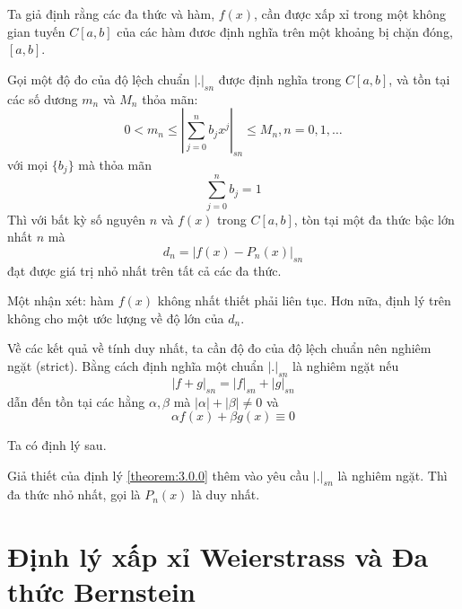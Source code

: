 Ta giả định rằng các đa thức và hàm, $f(x)$, cần được xấp xỉ trong một không gian tuyến $C[a, b]$ của các hàm đươc định nghĩa trên một khoảng bị chặn đóng, $[a, b]$. 

\begin{theorem}
    \label{theorem:3.0.0}
    Gọi một độ đo của độ lệch chuẩn $\left | . \right |_{sn}$ được định nghĩa trong $C[a, b]$, và tồn tại các số dương $m_n$ và $M_n$ thỏa mãn:
    \begin{equation}
        0 < m_n \leq \left | \sum_{j=0}^nb_jx^j \right |_{sn} \leq M_n, n = 0, 1, \dots
    \end{equation}
    với mọi $\{b_j\}$ mà thỏa mãn
    \begin{equation}
        \sum_{j=0}^nb_j = 1
    \end{equation}
    Thì với bất kỳ số nguyên $n$ và $f(x)$ trong $C[a, b]$, tòn tại một đa thức bậc lớn nhất $n$ mà
    \begin{equation}
        d_n = \left | f(x) - P_n(x) \right |_{sn}
    \end{equation}
    đạt được giá trị nhỏ nhất trên tất cả các đa thức.
\end{theorem}

Một nhận xét: hàm $f(x)$ không nhất thiết phải liên tục. Hơn nữa, định lý trên không cho một ước lượng về độ lớn của $d_n$. 

Về các kết quả về tính duy nhất, ta cần độ đo của độ lệch chuẩn nên nghiêm ngặt (strict). Bằng cách định nghĩa một chuẩn $\left | .\right |_{sn}$ là nghiêm ngặt nếu
\begin{equation}
    \left | f+g\right |_{sn} = \left | f\right |_{sn} + \left | g\right |_{sn}
\end{equation}
dẫn đến tồn tại các hằng $\alpha, \beta$ mà $\left | \alpha\right | + \left | \beta\right | \ne 0$ và 
\begin{equation}
    \alpha f(x) + \beta g(x) \equiv 0
\end{equation}

Ta có định lý sau. 
\begin{theorem}
    Giả thiết của định lý \ref{theorem:3.0.0} thêm vào yêu cầu $\left | .\right |_{sn}$ là nghiêm ngặt. Thì đa thức nhỏ nhất, gọi là $P_n(x)$ là duy nhất.
\end{theorem}

\section{Định lý xấp xỉ Weierstrass và Đa thức Bernstein}

